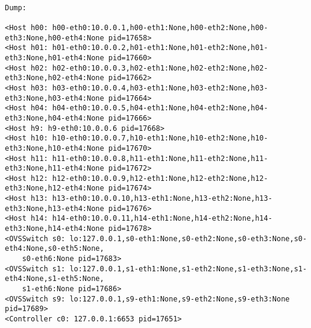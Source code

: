\begin{lstlisting}[caption={Mininet $dump$ on the used topology.}, label=lst:app:topo]

Dump:

<Host h00: h00-eth0:10.0.0.1,h00-eth1:None,h00-eth2:None,h00-eth3:None,h00-eth4:None pid=17658> 
<Host h01: h01-eth0:10.0.0.2,h01-eth1:None,h01-eth2:None,h01-eth3:None,h01-eth4:None pid=17660> 
<Host h02: h02-eth0:10.0.0.3,h02-eth1:None,h02-eth2:None,h02-eth3:None,h02-eth4:None pid=17662> 
<Host h03: h03-eth0:10.0.0.4,h03-eth1:None,h03-eth2:None,h03-eth3:None,h03-eth4:None pid=17664> 
<Host h04: h04-eth0:10.0.0.5,h04-eth1:None,h04-eth2:None,h04-eth3:None,h04-eth4:None pid=17666> 
<Host h9: h9-eth0:10.0.0.6 pid=17668> 
<Host h10: h10-eth0:10.0.0.7,h10-eth1:None,h10-eth2:None,h10-eth3:None,h10-eth4:None pid=17670> 
<Host h11: h11-eth0:10.0.0.8,h11-eth1:None,h11-eth2:None,h11-eth3:None,h11-eth4:None pid=17672> 
<Host h12: h12-eth0:10.0.0.9,h12-eth1:None,h12-eth2:None,h12-eth3:None,h12-eth4:None pid=17674> 
<Host h13: h13-eth0:10.0.0.10,h13-eth1:None,h13-eth2:None,h13-eth3:None,h13-eth4:None pid=17676> 
<Host h14: h14-eth0:10.0.0.11,h14-eth1:None,h14-eth2:None,h14-eth3:None,h14-eth4:None pid=17678> 
<OVSSwitch s0: lo:127.0.0.1,s0-eth1:None,s0-eth2:None,s0-eth3:None,s0-eth4:None,s0-eth5:None,
    s0-eth6:None pid=17683> 
<OVSSwitch s1: lo:127.0.0.1,s1-eth1:None,s1-eth2:None,s1-eth3:None,s1-eth4:None,s1-eth5:None,
    s1-eth6:None pid=17686> 
<OVSSwitch s9: lo:127.0.0.1,s9-eth1:None,s9-eth2:None,s9-eth3:None pid=17689> 
<Controller c0: 127.0.0.1:6653 pid=17651> 

\end{lstlisting}

